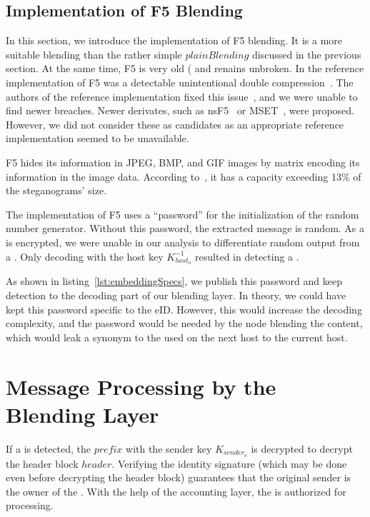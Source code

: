\subsection{Implementation of F5 Blending}
In this section, we introduce the implementation of F5 blending. It is a more suitable blending than the rather simple $plainBlending$ discussed in the previous section. At the same time, F5 is very old (\citeyear{f5} and renains unbroken. In the reference implementation of F5 was a detectable unintentional double compression~\cite{steganalysisf5}. The authors of the reference implementation fixed this issue~\cite{F5broken}, and we were unable to find newer breaches. Newer derivates, such as nsF5~\cite{fridrich2007statistically} or MSET~\cite{hosseini2015modification}, were proposed. However, we did not consider these as candidates as an appropriate reference implementation seemed to be unavailable.

F5 hides its information in JPEG, BMP, and GIF images by matrix encoding its information in the image data. According to~\cite{f5}, it has a capacity exceeding 13\% of the steganograms' size.

The implementation of F5 uses a ``password'' for the initialization of the random number generator. Without this password, the extracted message is random. As a \VortexMessage{} is encrypted, we were unable in our analysis to differentiate random output from a \VortexMessage. Only decoding with the host key $K^{-1}_{host_o}$ resulted in detecting a \VortexMessage.

As shown in listing~\ref{lst:embeddingSpecs}, we publish this password and keep detection to the decoding part of our blending layer. In theory, we could have kept this password specific to the eID. However, this would increase the decoding complexity, and the password would be needed by the node blending the content, which would leak a synonym to the  used on the next host to the current host.

\section{Message Processing by the Blending Layer}
If a \VortexMessage{} is detected, the $prefix$ with the sender key $K_{sender_o}$ is decrypted to decrypt the header block $header$. Verifying the identity signature (which may be done even before decrypting the header block) guarantees that the original sender is the owner of the . With the help of the accounting layer, the \VortexMessage{} is authorized for processing. 

